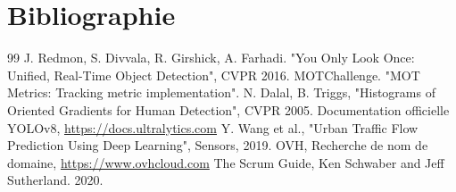 \chapter*{Bibliographie}

\begin{thebibliography}{99}
 J. Redmon, S. Divvala, R. Girshick, A. Farhadi. "You Only Look Once: Unified, Real-Time Object Detection", CVPR 2016.
 MOTChallenge. "MOT Metrics: Tracking metric implementation".
 N. Dalal, B. Triggs, "Histograms of Oriented Gradients for Human Detection", CVPR 2005.
 Documentation officielle YOLOv8, \url{https://docs.ultralytics.com}
 Y. Wang et al., "Urban Traffic Flow Prediction Using Deep Learning", Sensors, 2019.
 OVH, Recherche de nom de domaine, \url{https://www.ovhcloud.com}
 The Scrum Guide, Ken Schwaber and Jeff Sutherland. 2020.
\end{thebibliography}
